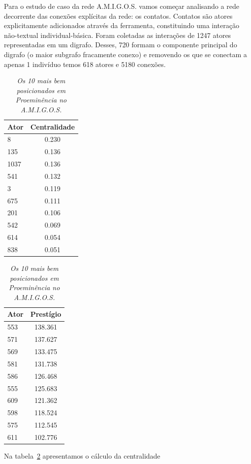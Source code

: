 \documentclass{article}
\begin{document}
\begin{table}[htbp]
	\begin{boxedminipage}{\textwidth}
Para o estudo de caso da rede A.M.I.G.O.S. vamos começar analisando a rede
decorrente das conexões explícitas da rede: os contatos. Contatos são atores
explicitamente adicionados através da ferramenta, constituindo uma interação
não-textual individual-básica. Foram coletadas as interações de 1247 atores
representadas em um digrafo. Desses, 720 formam o componente principal do
digrafo (o maior subgrafo fracamente conexo) e removendo os que se conectam a
apenas 1 indivíduo temos 618 atores e 5180 conexões.
		\large       %
		\setlength{\arrayrulewidth}{2\arrayrulewidth}  %
		\setlength{\belowcaptionskip}{10pt}  %
		\caption{\it Os 10 mais bem posicionados em Proeminência no A.M.I.G.O.S.}
		\centering   %
		\begin{tabular}{| l | c |}
			\hline
			Ator & Centralidade \\ \hline
			8 & 0.230 \\
			135 & 0.136 \\
			1037 & 0.136 \\
			541 & 0.132 \\
			3 & 0.119 \\
			675 & 0.111 \\
			201 & 0.106 \\
			542 & 0.069 \\
			614 & 0.054 \\
			838 & 0.051\\
			\hline
		\end{tabular}
		\begin{tabular}{| l | c |}
			\hline
			Ator & Prestígio \\ \hline
			553 & 138.361 \\
			571 & 137.627 \\
			569 & 133.475 \\
			581 & 131.738 \\
			586 & 126.468 \\
			555 & 125.683 \\
			609 & 121.362 \\
			598 & 118.524 \\
			575 & 112.545 \\
			611 & 102.776 \\
			\hline
		\end{tabular}
		\label{tab:acontccent}
\flushleft
\normalsize
Na tabela~\ref{tab:acontccent} apresentamos o cálculo da centralidade

\end{boxedminipage}
\end{table}
\end{document}
